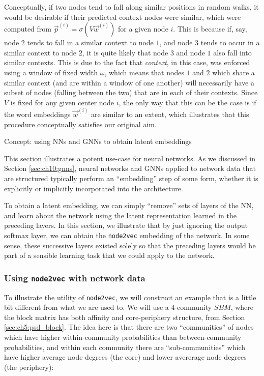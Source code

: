 Conceptually, if two nodes tend to fall along similar positions in random walks, it would be desirable if their predicted context nodes were similar, which were computed from $\vec p^{(i)} = \sigma\left(V\vec w^{(i)}\right)$ for a given node $i$. This is because if, say, node $2$ tends to fall in a similar context to node $1$, and node $3$ tends to occur in a similar context to node $2$, it is quite likely that node $3$ and node $1$ also fall into similar contexts. This is due to the fact that \textit{context}, in this case, was enforced using a window of fixed width $\omega$, which means that nodes $1$ and $2$ which share a similar context (and are within a window of one another) will necessarily have a subset of nodes (falling between the two) that are in each of their contexts. Since $V$ is fixed for any given center node $i$, the only way that this can be the case is if the word embeddings $\vec w^{(i)}$ are similar to an extent, which illustrates that this procedure conceptually satisfies our original aim.

\begin{floatingbox}\caption{Concept: using NNs and GNNs to obtain latent embeddings}
This section illustrates a potent use-case for neural networks. As we discussed in Section \ref{sec:ch10:gnns}, neural networks and GNNs applied to network data that are structured typically perform an ``embedding'' step of some form, whether it is explicitly or implicitly incorporated into the architecture. 

To obtain a latent embedding, we can simply ``remove'' sets of layers of the NN, and learn about the network using the latent representation learned in the preceding layers. In this section, we illustrate that by just ignoring the output softmax layer, we can obtain the \texttt{node2vec} embedding of the network. In some sense, these successive layers existed solely so that the preceding layers would be part of a sensible learning task that we could apply to the network. 
\end{floatingbox}

\subsubsection*{Using \texttt{node2vec} with network data}

To illustrate the utility of \texttt{node2vec}, we will construct an example that is a little bit different from what we are used to. We will use a $4$-community $SBM$, where the block matrix has both affinity and core-periphery structure, from Section \ref{sec:ch5:psd_block}. The idea here is that there are two ``communities'' of nodes which have higher within-community probabilities than between-community probabilities, and within each community there are ``sub-communities'' which have higher average node degrees (the core) and lower avererage node degrees (the periphery):

